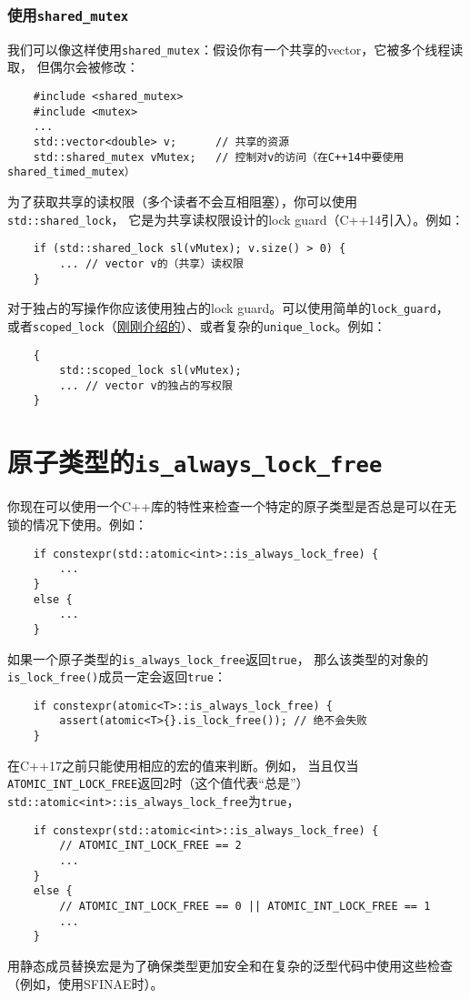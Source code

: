 \subsubsection{使用\texttt{shared\_mutex}}
我们可以像这样使用\texttt{shared\_mutex}：假设你有一个共享的vector，它被多个线程读取，
但偶尔会被修改：
\begin{lstlisting}
    #include <shared_mutex>
    #include <mutex>
    ...
    std::vector<double> v;      // 共享的资源
    std::shared_mutex vMutex;   // 控制对v的访问（在C++14中要使用shared_timed_mutex）
\end{lstlisting}
为了获取共享的读权限（多个读者不会互相阻塞），你可以使用\texttt{std::shared\_lock}，
它是为共享读权限设计的lock guard（C++14引入）。例如：
\begin{lstlisting}
    if (std::shared_lock sl(vMutex); v.size() > 0) {
        ... // vector v的（共享）读权限
    }
\end{lstlisting}
对于独占的写操作你应该使用独占的lock guard。可以使用简单的\texttt{lock\_guard}，
或者\texttt{scoped\_lock}（\hyperref[ch27.1.1]{刚刚介绍的}）、或者复杂的\texttt{unique\_lock}。例如：
\begin{lstlisting}
    {
        std::scoped_lock sl(vMutex);
        ... // vector v的独占的写权限
    }
\end{lstlisting}


\section{原子类型的\texttt{is\_always\_lock\_free}}
你现在可以使用一个C++库的特性来检查一个特定的原子类型是否总是可以在无锁的情况下使用。例如：
\begin{lstlisting}
    if constexpr(std::atomic<int>::is_always_lock_free) {
        ...
    }
    else {
        ...
    }
\end{lstlisting}
如果一个原子类型的\texttt{is\_always\_lock\_free}返回\texttt{true}，
那么该类型的对象的\texttt{is\_lock\_free()}成员一定会返回\texttt{true}：
\begin{lstlisting}
    if constexpr(atomic<T>::is_always_lock_free) {
        assert(atomic<T>{}.is_lock_free()); // 绝不会失败
    }
\end{lstlisting}
在C++17之前只能使用相应的宏的值来判断。例如，
当且仅当\texttt{ATOMIC\_INT\_LOCK\_FREE}返回\texttt{2}时（这个值代表“总是”）
\texttt{std::atomic<int>::is\_always\_lock\_free}为\texttt{true}，
\begin{lstlisting}
    if constexpr(std::atomic<int>::is_always_lock_free) {
        // ATOMIC_INT_LOCK_FREE == 2
        ...
    }
    else {
        // ATOMIC_INT_LOCK_FREE == 0 || ATOMIC_INT_LOCK_FREE == 1
        ...
    }
\end{lstlisting}
用静态成员替换宏是为了确保类型更加安全和在复杂的泛型代码中使用这些检查（例如，使用SFINAE时）。

